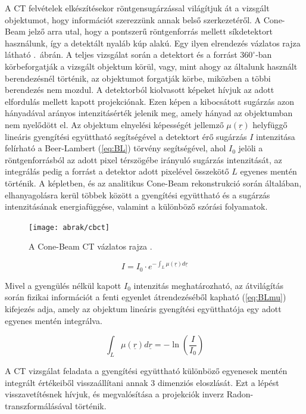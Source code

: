 \documentclass[a4paper,12pt]{article}
\begin{document}
A  CT felvételek elkészítésekor röntgensugárzással világítjuk át a vizsgált objektumot, hogy információt szerezzünk annak belső szerkezetéről. A Cone-Beam jelző arra utal, hogy a pontszerű röntgenforrás mellett síkdetektort használunk, így a detektált nyaláb kúp alakú. Egy ilyen elrendezés vázlatos rajza látható .~ábrán.  A teljes vizsgálat során a detektort és a forrást $360^\circ$-ban körbeforgatják a vizsgált objektum körül, vagy, mint ahogy az általunk használt berendezésnél történik, az objektumot forgatják körbe, miközben a többi berendezés nem mozdul. A detektorból kiolvasott képeket hívjuk az adott elfordulás mellett kapott projekciónak. Ezen képen a kibocsátott sugárzás azon hányadával arányos intenzitásérték jelenik meg, amely hányad az objektumban nem nyelődött el. Az objektum elnyelési képességét jellemző $\mu(\underline{r})$ helyfüggő lineáris gyengítési együttható segítségével a detektort érő sugárzás $I$ intenzitása felírható a Beer-Lambert (\ref{eq:BL}) törvény segítségével, ahol $I_0$ jelöli a röntgenforrásból az adott pixel térszögébe irányuló sugárzás intenzitását, az integrálás pedig a forrást a detektor adott pixelével összekötő $L$ egyenes mentén történik. A képletben, és az analitikus Cone-Beam rekonstrukció során általában, elhanyagolásra kerül többek között a gyengítési együttható és a sugárzás intenzitásának energiafüggése, valamint a különböző szórási folyamatok.  


\begin{figure}[htbp]
\center
\texttt{[image: abrak/cbct]}
\caption{A Cone-Beam CT vázlatos rajza \cite{noo}.}
\label{fig:cbct}
\end{figure}



\begin{equation}
\label{eq:BL}
I=I_0 \cdot e^{-\int_L \mu(\underline{r}) d\underline{r}}
\end{equation}


Mivel a gyengülés nélkül kapott $I_0$ intenzitás meghatározható, az átvilágítás során fizikai információt a fenti egyenlet átrendezéséből  kapható (\ref{eq:BLmu}) kifejezés adja, amely az objektum lineáris gyengítési együtthatója egy adott egyenes mentén integrálva.



\begin{equation}
\label{eq:BLmu}
{\int_L \mu(\underline{r}) d\underline{r}} = -\ln \left(\frac{I}{I_0} \right)
\end{equation}

A CT vizsgálat feladata a gyengítési együttható különböző egyenesek mentén integrált értékeiből visszaállítani annak 3 dimenziós eloszlását. Ezt a lépést visszavetítésnek hívjuk, és megvalósítása a projekciók inverz Radon-transzformálásával történik. 
\end{document}
